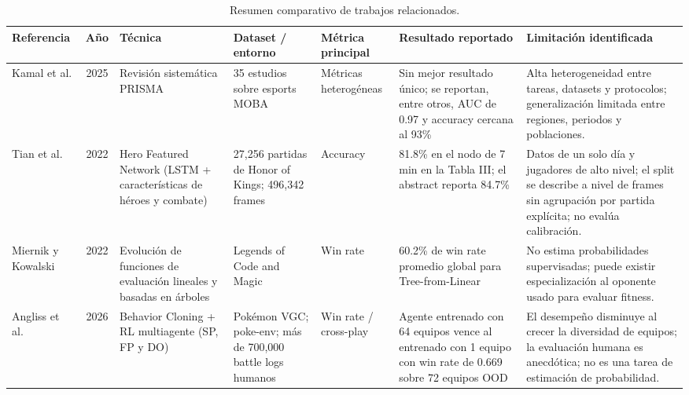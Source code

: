 %
\begin{table}[!t]
\centering
\caption{Resumen comparativo de trabajos relacionados.}
\label{tab:comparativa}
\footnotesize
\setlength{\tabcolsep}{4pt}
\begin{tabularx}{\textwidth}{@{}l c P{2.4cm} P{2.4cm} P{2.0cm} P{1.8cm} Y@{}}
\toprule
\textbf{Referencia} & \textbf{Año} & \textbf{Técnica} &
\textbf{Dataset / entorno} & \textbf{Métrica principal} &
\textbf{Resultado reportado} & \textbf{Limitación identificada}\\
\midrule
Kamal et al. \cite{kamal_moba_2025} & 2025 & Revisión sistemática PRISMA & 35 estudios sobre esports MOBA & Métricas heterogéneas & Sin mejor resultado único; se reportan, entre otros, AUC de 0.97 y accuracy cercana al 93\% & Alta heterogeneidad entre tareas, datasets y protocolos; generalización limitada entre regiones, periodos y poblaciones.\\

Tian et al. \cite{tian_hero_2022} & 2022 & Hero Featured Network (LSTM + características de héroes y combate) & 27,256 partidas de Honor of Kings; 496,342 frames & Accuracy & 81.8\% en el nodo de 7 min en la Tabla III; el abstract reporta 84.7\% & Datos de un solo día y jugadores de alto nivel; el split se describe a nivel de frames sin agrupación por partida explícita; no evalúa calibración.\\

Miernik y Kowalski \cite{miernik_evolving_2022} & 2022 & Evolución de funciones de evaluación lineales y basadas en árboles & Legends of Code and Magic & Win rate & 60.2\% de win rate promedio global para Tree-from-Linear & No estima probabilidades supervisadas; puede existir especialización al oponente usado para evaluar fitness.\\

Angliss et al. \cite{angliss_vgcbench_2026} & 2026 & Behavior Cloning + RL multiagente (SP, FP y DO) & Pokémon VGC; poke-env; más de 700,000 battle logs humanos & Win rate / cross-play & Agente entrenado con 64 equipos vence al entrenado con 1 equipo con win rate de 0.669 sobre 72 equipos OOD & El desempeño disminuye al crecer la diversidad de equipos; la evaluación humana es anecdótica; no es una tarea de estimación de probabilidad.\\


\end{tabularx}
\end{table}
